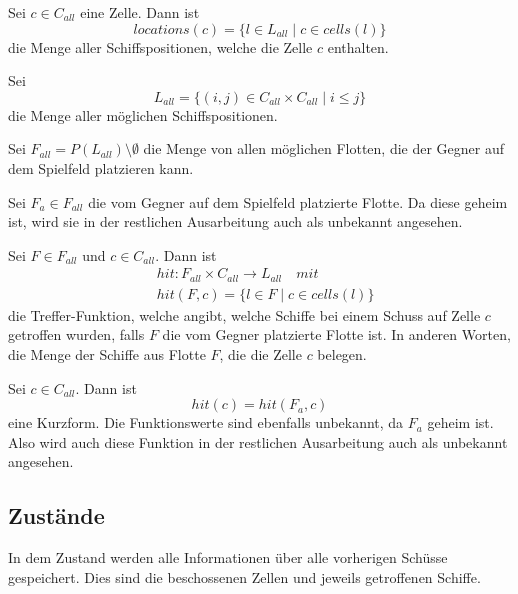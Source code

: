 \documentclass[a4paper,12pt]{llncs}
\numberwithin{equation}{section}
\begin{document}
\begin{definition}
Sei $c \in C_{all}$ eine Zelle.
Dann ist
\[
locations(c)=
\{
l
\in
L_{all}
\mid
c \in cells(l)
\}
\]
die Menge aller Schiffspositionen, welche die Zelle $c$ enthalten.
\end{definition}

\begin{definition}
Sei 
\[
L_{all}=
\{
(i, j) \in C_{all} \times C_{all}
\mid
i \leq j
\}
\] die Menge aller möglichen Schiffspositionen.
\end{definition}

\begin{definition}
Sei $F_{all}=P(L_{all}) \setminus \emptyset$ die Menge von allen möglichen Flotten, die der Gegner auf dem Spielfeld platzieren kann.
\end{definition}

\begin{definition}
Sei $F_a \in F_{all}$ die vom Gegner auf dem Spielfeld platzierte Flotte.
Da diese geheim ist, wird sie in der restlichen Ausarbeitung auch als unbekannt angesehen.
\end{definition}

\begin{definition}
Sei $F \in F_{all}$ und $c \in C_{all}$.
Dann ist 
\begin{align}
&hit:F_{all} \times C_{all} \rightarrow L_{all} \quad mit \nonumber\\
&hit(F, c)=\{l \in F \mid c \in cells(l)\} \nonumber
\end{align}
die Treffer-Funktion, welche angibt, welche Schiffe bei einem Schuss auf Zelle $c$ getroffen wurden, falls $F$ die vom Gegner platzierte Flotte ist. In anderen Worten, die Menge der Schiffe aus Flotte $F$, die die Zelle $c$ belegen.
\end{definition}

\begin{definition}
Sei $c \in C_{all}$.
Dann ist 
\[
hit(c)=hit(F_a, c)
\]
eine Kurzform. Die Funktionswerte sind ebenfalls unbekannt, da $F_a$ geheim ist. Also wird auch diese Funktion in der restlichen Ausarbeitung auch als unbekannt angesehen.
\end{definition}

\subsection{Zustände}

In dem Zustand werden alle Informationen über alle vorherigen Schüsse gespeichert.
Dies sind die beschossenen Zellen und jeweils getroffenen Schiffe.
\end{document}
